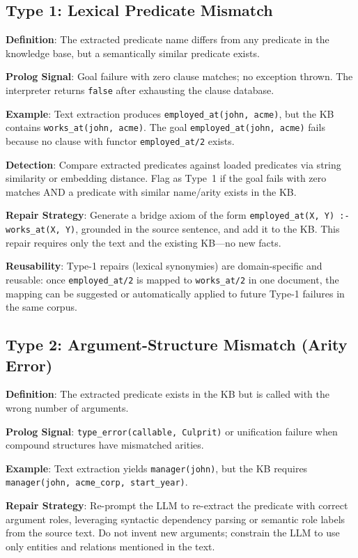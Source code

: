 \documentclass[11pt,letterpaper]{article}
\begin{document}
\subsection{Type 1: Lexical Predicate Mismatch}

\textbf{Definition}: The extracted predicate name differs from any predicate in the
knowledge base, but a semantically similar predicate exists.

\textbf{Prolog Signal}: Goal failure with zero clause matches; no exception thrown.
The interpreter returns \texttt{false} after exhausting the clause database.

\textbf{Example}: Text extraction produces \texttt{employed\_at(john, acme)}, but the
KB contains \texttt{works\_at(john, acme)}. The goal \texttt{employed\_at(john, acme)}
fails because no clause with functor \texttt{employed\_at/2} exists.

\textbf{Detection}: Compare extracted predicates against loaded predicates via string
similarity or embedding distance. Flag as Type~1 if the goal fails with zero matches
AND a predicate with similar name/arity exists in the KB.

\textbf{Repair Strategy}: Generate a bridge axiom of the form
\texttt{employed\_at(X,\,Y) :- works\_at(X,\,Y)}, grounded in the source sentence,
and add it to the KB. This repair requires only the text and the existing KB---no new
facts.

\textbf{Reusability}: Type-1 repairs (lexical synonymies) are domain-specific and
reusable: once \texttt{employed\_at/2} is mapped to \texttt{works\_at/2} in one
document, the mapping can be suggested or automatically applied to future Type-1
failures in the same corpus.

\subsection{Type 2: Argument-Structure Mismatch (Arity Error)}

\textbf{Definition}: The extracted predicate exists in the KB but is called with the
wrong number of arguments.

\textbf{Prolog Signal}: \texttt{type\_error(callable, Culprit)} or unification failure
when compound structures have mismatched arities.

\textbf{Example}: Text extraction yields \texttt{manager(john)}, but the KB requires
\texttt{manager(john, acme\_corp, start\_year)}.

\textbf{Repair Strategy}: Re-prompt the LLM to re-extract the predicate with correct
argument roles, leveraging syntactic dependency parsing or semantic role labels from
the source text. Do not invent new arguments; constrain the LLM to use only entities
and relations mentioned in the text.
\end{document}
